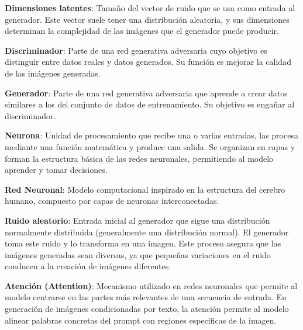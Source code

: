 \textbf{Dimensiones latentes}: Tamaño del vector de ruido que se usa como entrada al generador. Este vector suele tener una distribución aleatoria, y sus dimensiones determinan la complejidad de las imágenes que el generador puede producir.

\vspace{5mm}

\textbf{Discriminador}: Parte de una red generativa adversaria cuyo objetivo es distinguir entre datos reales y datos generados. Su función es mejorar la calidad de las imágenes generadas.

\vspace{5mm}

\textbf{Generador}: Parte de una red generativa adversaria que aprende a crear datos similares a los del conjunto de datos de entrenamiento. Su objetivo es engañar al discriminador.

\vspace{5mm}

\textbf{Neurona}: Unidad de procesamiento que recibe una o varias entradas, las procesa mediante una función matemática y produce una salida. Se organizan en capas y forman la estructura básica de las redes neuronales, permitiendo al modelo aprender y tomar decisiones.

\vspace{5mm}

\textbf{Red Neuronal}: Modelo computacional inspirado en la estructura del cerebro humano, compuesto por capas de neuronas interconectadas.

\vspace{5mm}

\textbf{Ruido aleatorio}: Entrada inicial al generador que sigue una distribución normalmente distribuida (generalmente una distribución normal). El generador toma este ruido y lo transforma en una imagen. Este proceso asegura que las imágenes generadas sean diversas, ya que pequeñas variaciones en el ruido conducen a la creación de imágenes diferentes.

\vspace{5mm}

\textbf{Atención (Attention)}: Mecanismo utilizado en redes neuronales que permite al modelo centrarse en las partes más relevantes de una secuencia de entrada. En generación de imágenes condicionadas por texto, la atención permite al modelo alinear palabras concretas del prompt con regiones específicas de la imagen.

\vspace{5mm}

